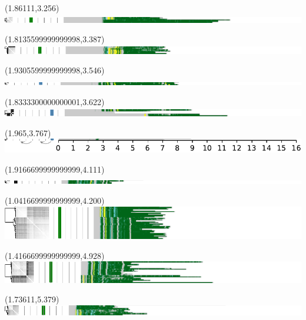 \documentclass{article}
\begin{document}
\begin{textblock}{13}(1.86111,3.256)\includegraphics{./Figure_S5/chr8-HG003.pdf}\end{textblock}
\begin{textblock}{13}(1.8135599999999998,3.387)\includegraphics{./Figure_S5/chr8-HG004.pdf}\end{textblock}
\begin{textblock}{13}(1.9305599999999998,3.546)\includegraphics{./Figure_S5/chr8-HG005.pdf}\end{textblock}
\begin{textblock}{13}(1.8333300000000001,3.622)\includegraphics{./Figure_S5/chr8-HG006.pdf}\end{textblock}
\begin{textblock}{13}(1.965,3.767)\includegraphics{./Figure_S5/chr8-HG007.pdf}\end{textblock}
\begin{textblock}{13}(1.9166699999999999,4.111)\includegraphics{./Figure_S5/chr11-HG001.pdf}\end{textblock}
\begin{textblock}{13}(1.0416699999999999,4.200)\includegraphics{./Figure_S5/chr11-HG002.pdf}\end{textblock}
\begin{textblock}{13}(1.4166699999999999,4.928)\includegraphics{./Figure_S5/chr11-HG003.pdf}\end{textblock}
\begin{textblock}{13}(1.73611,5.379)\includegraphics{./Figure_S5/chr11-HG004.pdf}\end{textblock}
\end{document}

